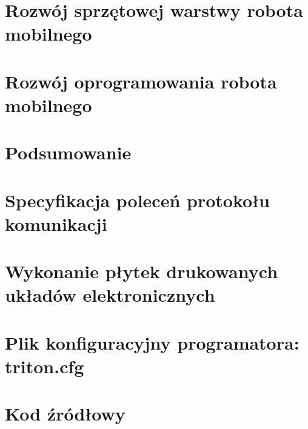 \documentclass[a4paper,12pt, oneside]{mwbk}
\begin{document}
\newpage
\chapter{Rozwój sprzętowej warstwy robota mobilnego}









\chapter{Rozwój oprogramowania robota mobilnego}





\newpage
\chapter*{Podsumowanie}


\newpage 
\appendix
\chapter{Specyfikacja poleceń protokołu komunikacji}

\chapter{Wykonanie płytek drukowanych układów elektronicznych}

\chapter{Plik konfiguracyjny programatora: triton.cfg}

\chapter*{Kod źródłowy}
%
\listoffigures
\listoftables

\newpage

{}


\newpage
\end{document}
